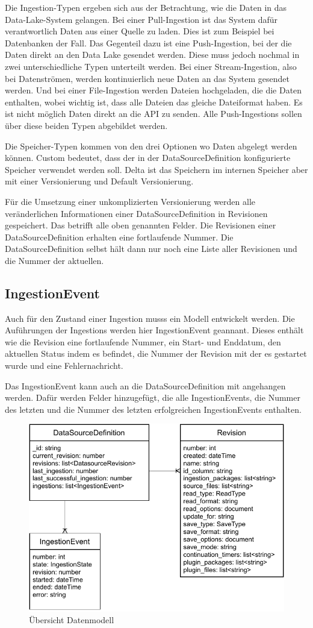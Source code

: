Die Ingestion-Typen ergeben sich aus der Betrachtung, wie die Daten in das Data-Lake-System gelangen.
Bei einer Pull-Ingestion ist das System dafür verantwortlich Daten aus einer Quelle zu laden.
Dies ist zum Beispiel bei Datenbanken der Fall.
Das Gegenteil dazu ist eine Push-Ingestion, bei der die Daten direkt an den Data Lake gesendet werden.
Diese muss jedoch nochmal in zwei unterschiedliche Typen unterteilt werden.
Bei einer Stream-Ingestion, also bei Datenströmen, werden kontinuierlich neue Daten an das System gesendet werden.
Und bei einer File-Ingestion werden Dateien hochgeladen, die die Daten enthalten, wobei wichtig ist, dass alle Dateien das gleiche Dateiformat haben.
Es ist nicht möglich Daten direkt an die API zu senden.
Alle Push-Ingestions sollen über diese beiden Typen abgebildet werden.

Die Speicher-Typen kommen von den drei Optionen wo Daten abgelegt werden können.
Custom bedeutet, dass der in der DataSourceDefinition konfigurierte Speicher verwendet werden soll.
Delta ist das Speichern im internen Speicher aber mit einer Versionierung und Default Versionierung.

Für die Umsetzung einer unkomplizierten Versionierung werden alle veränderlichen Informationen einer DataSourceDefinition in Revisionen gespeichert.
Das betrifft alle oben genannten Felder.
Die Revisionen einer DataSourceDefinition erhalten eine fortlaufende Nummer.
Die DataSourceDefinition selbst hält dann nur noch eine Liste aller Revisionen und die Nummer der aktuellen.

\subsection{IngestionEvent}

Auch für den Zustand einer Ingestion musss ein Modell entwickelt werden.
Die Auführungen der Ingestions werden hier IngestionEvent geannant.
Dieses enthält wie die Revision eine fortlaufende Nummer, ein Start- und Enddatum, den aktuellen Status indem es befindet, die Nummer der Revision mit der es gestartet wurde und eine Fehlernachricht.

Das IngestionEvent kann auch an die DataSourceDefinition mit angehangen werden.
Dafür werden Felder hinzugefügt, die alle IngestionEvents, die Nummer des letzten und die Nummer des letzten erfolgreichen IngestionEvents enthalten.

\begin{figure}
    \centering
    \includegraphics{Grafiken/Entwicklung-Datenmodell.pdf}
    \caption{Übersicht Datenmodell}
    \label{fig:datenmodell}
\end{figure}